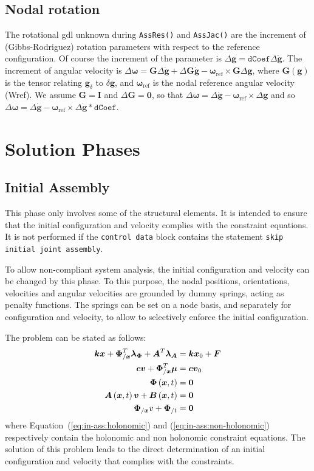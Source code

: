\documentclass[10pt,dvips,fleqn,subeqn]{report}
\newcommand{\T}[1]{\boldsymbol{#1}}
\begin{document}
\section{Nodal rotation}
The rotational gdl unknown during \texttt{AssRes()} and \texttt{AssJac()}
are the increment of (Gibbs-Rodriguez) rotation parameters
with respect to the reference configuration.
Of course the increment of the parameter is
$\Delta \T g=\texttt{dCoef}\Delta \dot{\T g}$.
The increment of angular velocity is 
$\Delta \T \omega = \T G\Delta \dot{\T g}+ \Delta \T G \dot{\T g}-
\T \omega_{\mathrm{ref}}\times \T G \Delta \T g$,
where $\T G(\T g)$ is the tensor relating $\T g_\delta$ to $\delta \T g$,
and $\T \omega_{\mathrm{ref}}$ is the nodal reference angular velocity (Wref).
We assume $\T G = \T I$ and $\Delta \T G = \T 0$,
so that $\Delta \T \omega = \Delta \dot{\T g}-\T \omega_{\mathrm{ref}}\times\Delta \T g$
and so $\Delta \T \omega = \Delta \dot{\T g}-
\T \omega_{\mathrm{ref}}\times\Delta \dot{\T g} * \texttt{dCoef}$.


\chapter{Solution Phases}
\section{Initial Assembly}
This phase only involves some of the structural elements.
It is intended to ensure that the initial configuration and velocity 
complies with the constraint equations.
It is not performed if the \texttt{control data} block contains 
the statement \texttt{skip initial joint assembly}.

To allow non-compliant system analysis, the initial configuration 
and velocity can be changed by this phase.
To this purpose, the nodal positions, orientations, velocities
and angular velocities are grounded by dummy springs, acting 
as penalty functions.
The springs can be set on a node basis, and separately 
for configuration and velocity, to allow to selectively enforce 
the initial configuration.

The problem can be stated as follows:
\begin{align}
	\T{k} \T{x} + \T{\Phi}_{/\T{x}}^T \T{\lambda}_{\T{\Phi}} + \T{A}^T \T{\lambda}_{\T{A}}
		& = \T{k} \T{x}_0 + \T{F} \\
	\T{c} \T{v} + \T{\Phi}_{/\T{x}}^T \T{\mu} & = \T{c} \T{v}_0 \\
	\T{\Phi}\plbr{\T{x}, t} & = \T{0} \label{eq:in-ass:holonomic} \\
	\T{A}\plbr{\T{x}, t} \T{v} + \T{B}\plbr{\T{x}, t} & = \T{0} \label{eq:in-ass:non-holonomic} \\
	\T{\Phi}_{/\T{x}} v + \T{\Phi}_{/t} & = \T{0}
\end{align}
where Equation~(\ref{eq:in-ass:holonomic}) and (\ref{eq:in-ass:non-holonomic})
respectively contain the holonomic and non holonomic constraint equations.
The solution of this problem leads to the direct determination
of an initial configuration and velocity that complies 
with the constraints.
\end{document}
